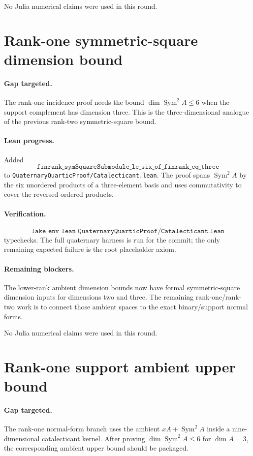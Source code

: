 \documentclass[11pt]{article}
\begin{document}
No Julia numerical claims were used in this round.

\section*{Rank-one symmetric-square dimension bound}

\paragraph{Gap targeted.}
The rank-one incidence proof needs the bound
\(\dim\operatorname{Sym}^2 A\le6\) when the support complement has dimension
three.  This is the three-dimensional analogue of the previous rank-two
symmetric-square bound.

\paragraph{Lean progress.}
Added
\[
\texttt{finrank\_symSquareSubmodule\_le\_six\_of\_finrank\_eq\_three}
\]
to \texttt{QuaternaryQuarticProof/Catalecticant.lean}.  The proof spans
\(\operatorname{Sym}^2 A\) by the six unordered products of a three-element
basis and uses commutativity to cover the reversed ordered products.

\paragraph{Verification.}
\[
\texttt{lake env lean QuaternaryQuarticProof/Catalecticant.lean}
\]
typechecks.  The full quaternary harness is run for the commit; the only
remaining expected failure is the root placeholder axiom.

\paragraph{Remaining blockers.}
The lower-rank ambient dimension bounds now have formal symmetric-square
dimension inputs for dimensions two and three.  The remaining rank-one/rank-two
work is to connect those ambient spaces to the exact binary/support normal
forms.

No Julia numerical claims were used in this round.

\section*{Rank-one support ambient upper bound}

\paragraph{Gap targeted.}
The rank-one normal-form branch uses the ambient \(xA+\operatorname{Sym}^2 A\)
inside a nine-dimensional catalecticant kernel.  After proving
\(\dim\operatorname{Sym}^2 A\le6\) for \(\dim A=3\), the corresponding ambient
upper bound should be packaged.
\end{document}
